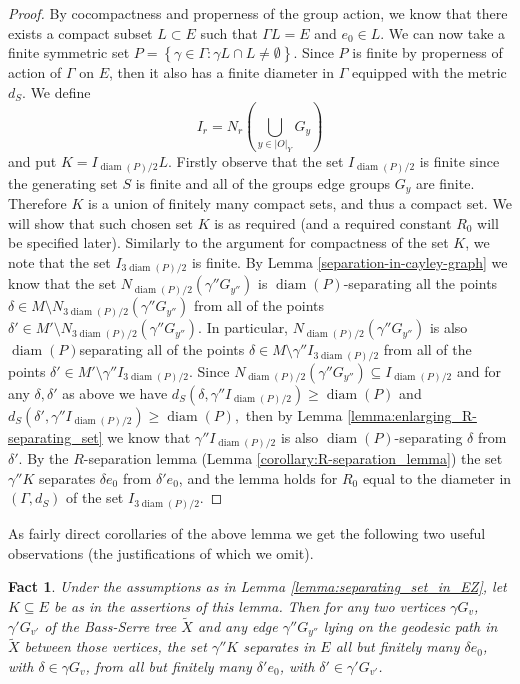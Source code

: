 \documentclass[12pt, a4paper]{article}
\newcommand{\8}{\infty}
\newcommand{\abs}[1]{\left| #1 \right|}
\newcommand{\set}[1]{\left\{ #1 \right\}}
\DeclareMathOperator{\diam}{diam}
\theoremstyle{break}
\newtheorem{fact}[thm]{Fact}
\theoremstyle{defbreak}
\newcommand{\wtl}[1]{\widetilde{#1}}
\begin{document}
\begin{proof}
    By cocompactness and properness of the group action, we know that there exists 
    a compact subset $L\subset E$ such that $\Gamma L = E$ and $e_0\in L$. We can now take a finite symmetric set $P = \set{\gamma\in\Gamma:\gamma L\cap L \neq \emptyset}$. Since $P$ is finite by properness of action of $\Gamma$ on $E$, then it also has a finite diameter in $\Gamma$ equipped with the metric $d_S$. We define
    $$I_r =N_{r}\left(\bigcup_{y\in\abs{O}_Y}G_y\right)$$
    and put
    $K = I_{\diam(P)/2}L$. Firstly observe that the set  $I_{\diam(P)/2}$ is finite since the generating set $S$ is finite and all of the groups edge groups $G_y$ are finite. Therefore $K$ is a union of finitely many compact sets, and thus a compact set. We will show that such chosen set $K$ is as required (and a required constant $R_0$ will be specified later). Similarly to the argument for compactness of the set $K$, we note that the set $I_{3\diam(P)/2}$ is finite. By Lemma \ref{separation-in-cayley-graph} we know that the set $N_{\diam(P)/2}(\gamma''G_{y''})$ is $\diam(P)$-separating all the points $\delta\in M\setminus N_{3\diam(P)/2}(\gamma'' G_{y''})$ from all of the points $\delta'\in M'\setminus N_{3\diam(P)/2}(\gamma'' G_{y''})$. In particular, $N_{\diam(P)/2}(\gamma''G_{y''})$ is also $\diam(P)$\Hyphdash*separating all of the points 
    $\delta\in M \setminus \gamma''I_{3\diam(P)/2}$
    from all of the points 
    $\delta'\in M' \setminus \gamma''I_{3\diam(P)/2}.$
    Since $N_{\diam(P)/2}(\gamma''G_{y''}) \subseteq I_{\diam(P)/2}$ and for any $\delta, \delta'$ as above we have 
    $d_S\left(\delta, \gamma''I_{\diam(P)/2}\right) \geqslant \diam(P)$
    and 
    $d_S\left(\delta', \gamma''I_{\diam(P)/2}\right) \geqslant \diam(P),$
    then by Lemma \ref{lemma:enlarging_R-separating_set} we know that $\gamma''I_{\diam(P)/2}$ is also $\diam(P)$-separating $\delta$ from $\delta'$. By the $R$-separation lemma (Lemma \ref{corollary:R-separation_lemma}) the set $\gamma''K$ separates $\delta e_0$ from $\delta'e_0$,
    and the lemma holds for $R_0$ equal to the diameter in $(\Gamma,d_S)$ of the set $I_{3\diam(P)/2}$. 
\end{proof}

As fairly direct corollaries of the above lemma we get the following two useful observations (the justifications of which we omit). 

\medskip

\begin{fact}\label{lemma:final_separation}
Under the assumptions as in Lemma \ref{lemma:separating_set_in_EZ}, 
let $K\subseteq E$ be as in the assertions of this lemma. Then for any two vertices $\gamma G_v$, $\gamma'G_{v'}$ of the Bass-Serre tree $\wtl{X}$ and any edge $\gamma''G_{y''}$ lying on the geodesic path in $\wtl{X}$ between those vertices, the set $\gamma''K$ separates 
in $E$ all but finitely many $\delta e_0$, with $\delta\in \gamma G_v$, from all but finitely many $\delta'e_0$, with $\delta'\in \gamma' G_{v'}$. 
\end{fact}
\end{document}
